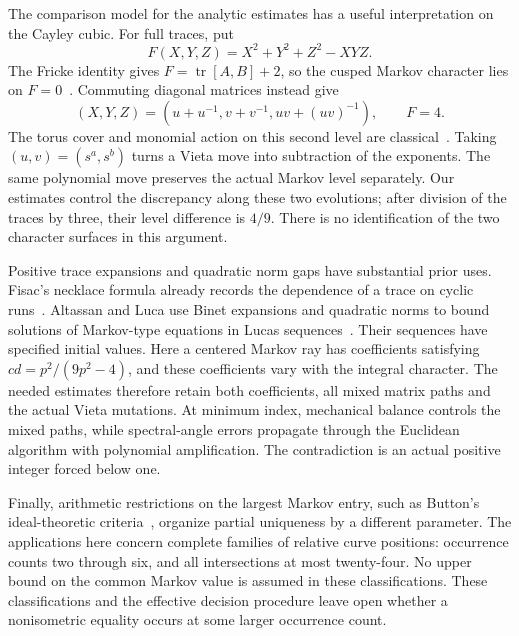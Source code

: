 The comparison model for the analytic estimates has a useful interpretation
on the Cayley cubic. For full traces, put
$$
F(X,Y,Z)=X^2+Y^2+Z^2-XYZ.
$$
The Fricke identity gives $F=\operatorname{tr}[A,B]+2$, so the cusped
Markov character lies on $F=0$~\cite{Goldman2003}. Commuting diagonal
matrices instead give
$$
(X,Y,Z)=(u+u^{-1},v+v^{-1},uv+(uv)^{-1}),\qquad F=4.
$$
The torus cover and monomial action on this second level are
classical~\cite[Sections~1.5 and~2.1]{CantatLoray2009}. Taking
$(u,v)=(s^a,s^b)$ turns a Vieta move into subtraction of the exponents.
The same polynomial move preserves the actual Markov level separately.
Our estimates control the discrepancy along these two evolutions;
after division of the traces by three, their level difference is $4/9$.
There is no identification of the two character surfaces in this argument.

Positive trace expansions and quadratic norm gaps have substantial prior
uses. Fisac's necklace formula already records the dependence of a trace
on cyclic runs~\cite[Theorem~1.1 and Section~4]{Fisac2025}.
Altassan and Luca use Binet expansions and quadratic norms to bound
solutions of Markov-type equations in Lucas
sequences~\cite[Theorem~1.1 and Lemmas~2.1--2.2]{AltassanLuca2021}.
Their sequences have specified initial values. Here a centered Markov ray
has coefficients satisfying $cd=p^2/(9p^2-4)$, and these coefficients
vary with the integral character. The needed estimates therefore retain
both coefficients, all mixed matrix paths and the actual Vieta mutations.
At minimum index, mechanical balance controls the mixed paths, while
spectral-angle errors propagate through the Euclidean algorithm with
polynomial amplification. The contradiction is an actual positive
integer forced below one.

Finally, arithmetic restrictions on the largest Markov entry, such as
Button's ideal-theoretic criteria~\cite{Button2001}, organize partial
uniqueness by a different parameter. The applications here concern complete
families of relative curve positions: occurrence counts two through six,
and all intersections at most twenty-four. No upper bound on the common
Markov value is assumed in these classifications. These classifications and
the effective decision procedure leave open whether a nonisometric equality
occurs at some larger occurrence count.
